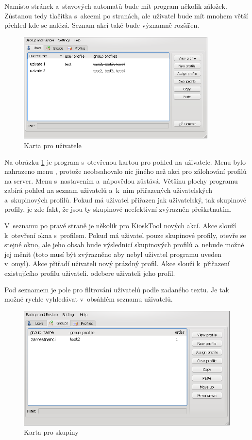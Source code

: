 Namísto stránek a~stavových automatů bude mít program několik záložek. Zůstanou tedy tlačítka s~akcemi po stranách, ale uživatel bude mít mnohem větší přehled kde se nalézá. Seznam akcí také bude významně rozšířen.

\begin{figure}
\centering
\includegraphics[width=10cm]{obrazky/navrh-usersz.png}
\caption{Karta pro uživatele}
\label{fig:kt4_newusers}
\end{figure}

Na obrázku \ref{fig:kt4_newusers} je program s~otevřenou kartou pro pohled na uživatele. Menu  bylo nahrazeno menu , protože neobsahovalo nic jiného než akci pro zálohování profilů na server. Menu s~nastavením a~nápovědou zůstává. Většinu plochy programu zabírá pohled na seznam uživatelů a~k~nim přiřazených uživatelských a~skupinových profilů. Pokud má uživatel přiřazen jak uživatelský, tak skupinové profily, je zde fakt, že jsou ty skupinové neefektivní zvýrazněn přeškrtnutím.

V~seznamu po pravé straně je několik pro KioskTool nových akcí. Akce  slouží k~otevření okna s~profilem. Pokud má uživatel pouze skupinové profily, otevře se stejné okno, ale jeho obsah bude výslednicí skupinových profilů a~nebude možné jej měnit (toto musí být zvýrazněno aby nebyl uživatel programu uveden v~omyl). Akce  přiřadí uživateli nový prázdný profil. Akce  slouží k~přiřazení existujícího profilu uživateli.  odebere uživateli jeho profil.

Pod seznamem je pole pro filtrování uživatelů podle zadaného textu. Je tak možné rychle vyhledávat v~obsáhlém seznamu uživatelů.

\begin{figure}
\centering
\includegraphics[width=13cm]{obrazky/navrh-groupsz.png}
\caption{Karta pro skupiny}
\label{fig:kt4_newgroups}
\end{figure}

